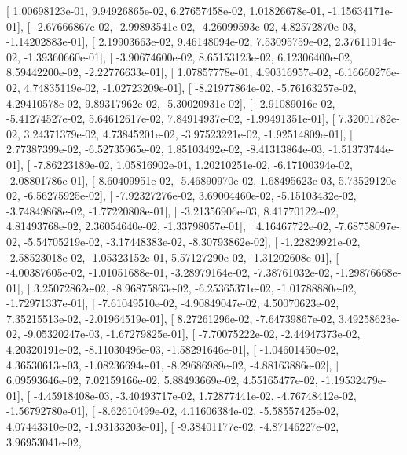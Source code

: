 \documentclass{article}
\begin{document}
       [  1.00698123e-01,   9.94926865e-02,   6.27657458e-02,
          1.01826678e-01,  -1.15634171e-01],
       [ -2.67666867e-02,  -2.99893541e-02,  -4.26099593e-02,
          4.82572870e-03,  -1.14202883e-01],
       [  2.19903663e-02,   9.46148094e-02,   7.53095759e-02,
          2.37611914e-02,  -1.39360660e-01],
       [ -3.90674600e-02,   8.65153123e-02,   6.12306400e-02,
          8.59442200e-02,  -2.22776633e-01],
       [  1.07857778e-01,   4.90316957e-02,  -6.16660276e-02,
          4.74835119e-02,  -1.02723209e-01],
       [ -8.21977864e-02,  -5.76163257e-02,   4.29410578e-02,
          9.89317962e-02,  -5.30020931e-02],
       [ -2.91089016e-02,  -5.41274527e-02,   5.64612617e-02,
          7.84914937e-02,  -1.99491351e-01],
       [  7.32001782e-02,   3.24371379e-02,   4.73845201e-02,
         -3.97523221e-02,  -1.92514809e-01],
       [  2.77387399e-02,  -6.52735965e-02,   1.85103492e-02,
         -8.41313864e-03,  -1.51373744e-01],
       [ -7.86223189e-02,   1.05816902e-01,   1.20210251e-02,
         -6.17100394e-02,  -2.08801786e-01],
       [  8.60409951e-02,  -5.46890970e-02,   1.68495623e-03,
          5.73529120e-02,  -6.56275925e-02],
       [ -7.92327276e-02,   3.69004460e-02,  -5.15103432e-02,
         -3.74849868e-02,  -1.77220808e-01],
       [ -3.21356906e-03,   8.41770122e-02,   4.81493768e-02,
          2.36054640e-02,  -1.33798057e-01],
       [  4.16467722e-02,  -7.68758097e-02,  -5.54705219e-02,
         -3.17448383e-02,  -8.30793862e-02],
       [ -1.22829921e-02,  -2.58523018e-02,  -1.05323152e-01,
          5.57127290e-02,  -1.31202608e-01],
       [ -4.00387605e-02,  -1.01051688e-01,  -3.28979164e-02,
         -7.38761032e-02,  -1.29876668e-01],
       [  3.25072862e-02,  -8.96875863e-02,  -6.25365371e-02,
         -1.01788880e-02,  -1.72971337e-01],
       [ -7.61049510e-02,  -4.90849047e-02,   4.50070623e-02,
          7.35215513e-02,  -2.01964519e-01],
       [  8.27261296e-02,  -7.64739867e-02,   3.49258623e-02,
         -9.05320247e-03,  -1.67279825e-01],
       [ -7.70075222e-02,  -2.44947373e-02,   4.20320191e-02,
         -8.11030496e-03,  -1.58291646e-01],
       [ -1.04601450e-02,   4.36530613e-03,  -1.08236694e-01,
         -8.29686989e-02,  -4.88163886e-02],
       [  6.09593646e-02,   7.02159166e-02,   5.88493669e-02,
          4.55165477e-02,  -1.19532479e-01],
       [ -4.45918408e-03,  -3.40493717e-02,   1.72877441e-02,
         -4.76748412e-02,  -1.56792780e-01],
       [ -8.62610499e-02,   4.11606384e-02,  -5.58557425e-02,
          4.07443310e-02,  -1.93133203e-01],
       [ -9.38401177e-02,  -4.87146227e-02,   3.96953041e-02,
\end{document}
